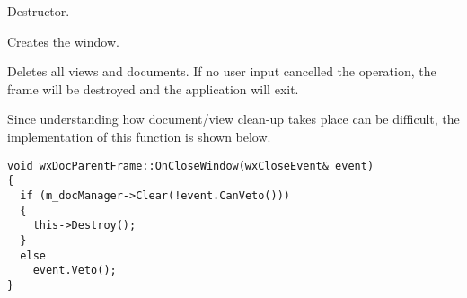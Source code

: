 Destructor.

\label{wxdocmdiparentframecreate}


Creates the window.

\label{wxdocmdiparentframeonclosewindow}


Deletes all views and documents. If no user input cancelled the
operation, the frame will be destroyed and the application will exit.

Since understanding how document/view clean-up takes place can be difficult,
the implementation of this function is shown below.

\begin{verbatim}
void wxDocParentFrame::OnCloseWindow(wxCloseEvent& event)
{
  if (m_docManager->Clear(!event.CanVeto()))
  {
    this->Destroy();
  }
  else
    event.Veto();
}
\end{verbatim}


